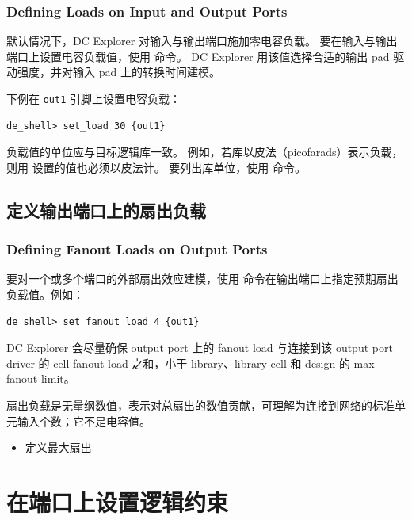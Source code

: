 \subsubsection*{Defining Loads on Input and Output Ports}

默认情况下，DC Explorer 对输入与输出端口施加零电容负载。
要在输入与输出端口上设置电容负载值，使用  命令。
DC Explorer 用该值选择合适的输出 pad 驱动强度，并对输入 pad 上的转换时间建模。

下例在 \texttt{out1} 引脚上设置电容负载：
\begin{lstlisting}
de_shell> set_load 30 {out1}
\end{lstlisting}

负载值的单位应与目标逻辑库一致。
例如，若库以皮法（picofarads）表示负载，则用  设置的值也必须以皮法计。
要列出库单位，使用  命令。

\subsection{定义输出端口上的扇出负载}
\subsubsection*{Defining Fanout Loads on Output Ports}

要对一个或多个端口的外部扇出效应建模，使用  命令在输出端口上指定预期扇出负载值。例如：
\begin{lstlisting}
de_shell> set_fanout_load 4 {out1}
\end{lstlisting}

DC Explorer 会尽量确保 output port 上的 fanout load 与连接到该 output port driver 的 cell fanout load 之和，小于 library、library cell 和 design 的 max fanout limit。

扇出负载是无量纲数值，表示对总扇出的数值贡献，可理解为连接到网络的标准单元输入个数；它不是电容值。

\begin{seeAlsoBox}
\begin{itemize}
  \item 定义最大扇出
\end{itemize}
\end{seeAlsoBox}

\section{在端口上设置逻辑约束}
